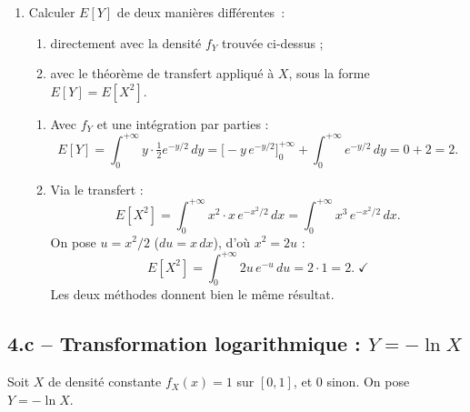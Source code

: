 \begin{enumerate}
  \item Calculer $E[Y]$ de deux manières différentes~:
  \begin{enumerate}
    \item directement avec la densité $f_Y$ trouvée ci-dessus ;
    \item avec le théorème de transfert appliqué à $X$,
  sous la forme $E[Y]=E[X^2]$.
  \end{enumerate}
  \begin{solution}
    \begin{enumerate}
    \item Avec $f_Y$ et une intégration par parties :
    \[
      E[Y]=\int_0^{+\infty}y\cdot\tfrac{1}{2}e^{-y/2}\,dy
      =\bigl[-y\,e^{-y/2}\bigr]_0^{+\infty}
      +\int_0^{+\infty}e^{-y/2}\,dy
      =0+2=2.
    \]

    \item Via le transfert :
    \[
      E[X^2]=\int_0^{+\infty}x^2\cdot x\,e^{-x^2/2}\,dx
      =\int_0^{+\infty}x^3\,e^{-x^2/2}\,dx.
    \]
    On pose $u=x^2/2$ ($du=x\,dx$), d'où $x^2=2u$ :
    \[
      E[X^2]=\int_0^{+\infty}2u\,e^{-u}\,du=2\cdot 1=2.\;\checkmark
    \]
    Les deux méthodes donnent bien le même résultat.
    \end{enumerate}
  \end{solution}
\end{enumerate}

\subsection*{4.c -- Transformation logarithmique : $Y=-\ln X$}

Soit $X$ de densité constante $f_X(x)=1$ sur $[0,1]$, et $0$ sinon.
On pose $Y=-\ln X$.

